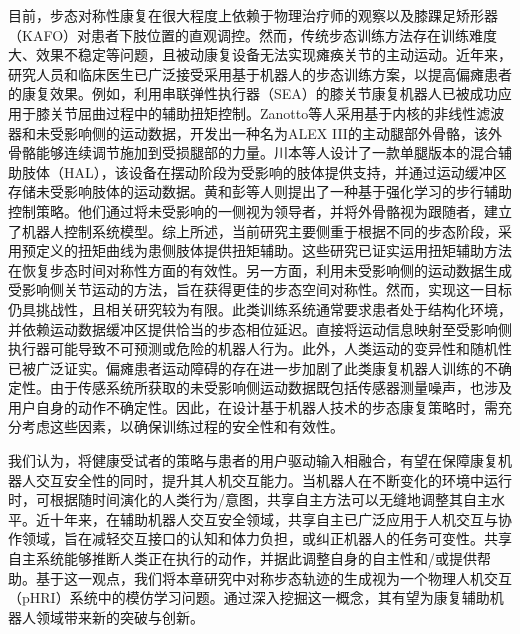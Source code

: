 目前，步态对称性康复在很大程度上依赖于物理治疗师的观察以及膝踝足矫形器（KAFO）对患者下肢位置的直观调控\cite{abeNarrativeReviewAlternate2021}。然而，传统步态训练方法存在训练难度大、效果不稳定等问题，且被动康复设备无法实现瘫痪关节的主动运动。近年来，研究人员和临床医生已广泛接受采用基于机器人的步态训练方案，以提高偏瘫患者的康复效果。例如，利用串联弹性执行器（SEA）的膝关节康复机器人已被成功应用于膝关节屈曲过程中的辅助扭矩控制\cite{sulzerHighlyBackdrivableLightweight2009,zhongGaitSymmetryEnhancement2022}。Zanotto等人采用基于内核的非线性滤波器和未受影响侧的运动数据，开发出一种名为ALEX III的主动腿部外骨骼，该外骨骼能够连续调节施加到受损腿部的力量\cite{zanottoAdaptiveAssistasneededController2014a}。川本等人设计了一款单腿版本的混合辅助肢体（HAL），该设备在摆动阶段为受影响的肢体提供支持，并通过运动缓冲区存储未受影响肢体的运动数据\cite{kawamotoDevelopmentAssistController2014a,kawamotoModificationHemiplegicCompensatory2015}。黄和彭等人则提出了一种基于强化学习的步行辅助控制策略。他们通过将未受影响的一侧视为领导者，并将外骨骼视为跟随者，建立了机器人控制系统模型\cite{huangLearningbasedWalkingAssistance2018,pengDataDrivenReinforcementLearning2020}。综上所述，当前研究主要侧重于根据不同的步态阶段，采用预定义的扭矩曲线为患侧肢体提供扭矩辅助。这些研究已证实运用扭矩辅助方法在恢复步态时间对称性方面的有效性。另一方面，利用未受影响侧的运动数据生成受影响侧关节运动的方法，旨在获得更佳的步态空间对称性。然而，实现这一目标仍具挑战性，且相关研究较为有限。此类训练系统通常要求患者处于结构化环境，并依赖运动数据缓冲区提供恰当的步态相位延迟。直接将运动信息映射至受影响侧执行器可能导致不可预测或危险的机器人行为。此外，人类运动的变异性和随机性已被广泛证实\cite{vanbeersRoleExecutionNoise2004}。偏瘫患者运动障碍的存在进一步加剧了此类康复机器人训练的不确定性。由于传感系统所获取的未受影响侧运动数据既包括传感器测量噪声，也涉及用户自身的动作不确定性\cite{gopinathCustomizedHandlingUnintended2021}。因此，在设计基于机器人技术的步态康复策略时，需充分考虑这些因素，以确保训练过程的安全性和有效性。

我们认为，将健康受试者的策略与患者的用户驱动输入相融合，有望在保障康复机器人交互安全性的同时，提升其人机交互能力。当机器人在不断变化的环境中运行时，可根据随时间演化的人类行为/意图，共享自主方法可以无缝地调整其自主水平\cite{selvaggioAutonomyPhysicalHumanRobot2021a}。近十年来，在辅助机器人交互安全领域，共享自主已广泛应用于人机交互与协作领域，旨在减轻交互接口的认知和体力负担\cite{dingHumanintheloopOptimizationHip2018a}，或纠正机器人的任务可变性\cite{hagenowCorrectiveSharedAutonomy2021}。共享自主系统能够推断人类正在执行的动作，并据此调整自身的自主性和/或提供帮助。基于这一观点，我们将本章研究中对称步态轨迹的生成视为一个物理人机交互（pHRI）系统中的模仿学习问题。通过深入挖掘这一概念，其有望为康复辅助机器人领域带来新的突破与创新。

